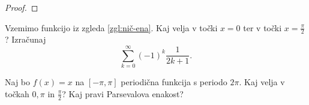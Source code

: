 \begin{proof}
    \todo{}
\end{proof}

\begin{zgled}
    Vzemimo funkcijo iz zgleda \ref{zgl:nič-ena}. Kaj velja v točki \(x =0\) ter v točki \(x = \frac{\pi}{2}\)? Izračunaj \[
        \sum_{k=0}^{\infty}(-1)^{k}\frac{1}{2k+1}.
    \]
\end{zgled}

\begin{zgled}
    Naj bo \(f(x) = x\) na \([-\pi, \pi]\) periodična funkcija s periodo \(2\pi\). Kaj velja v točkah \(0, \pi\) in \(\frac{\pi}{2}\)? Kaj pravi Parsevalova enakost?
\end{zgled}



